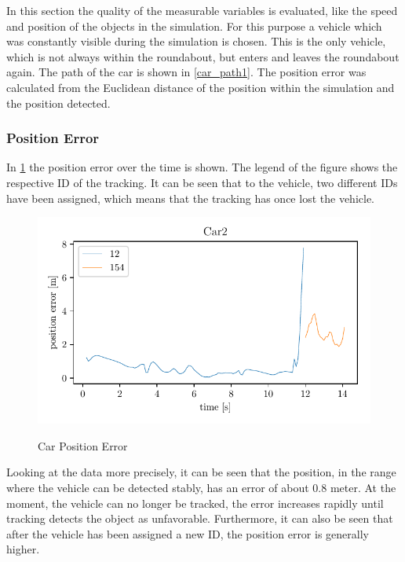 \documentclass[11pt,oneside,openright]{mpreport}
\begin{document}
In this section the quality of the measurable variables is evaluated, like the speed and position of the objects in the simulation.
For this purpose a vehicle which was constantly visible during the simulation is chosen.
This is the only vehicle, which is not always within the roundabout, but enters and leaves the roundabout again. 
The path of the car is shown in \cref{car_path1}. The position error was calculated from the Euclidean distance of the position within the simulation and the position detected.

\subsubsection{Position Error}


In \cref{car_pos_err} the position error over the time is shown. The legend of the figure shows the respective ID of the tracking. 
It can be seen that to the vehicle, two different IDs have been assigned, which means that the tracking has once lost the vehicle.

\begin{figure}[!htb]
  \caption{Car Position Error} 
  \centering
  \includegraphics[width=\textwidth]{bilder/Car2_pos_err.pdf}
 \label{car_pos_err}
\end{figure}
Looking at the data more precisely, it can be seen that the position, in the range where the vehicle can be detected stably, has an error of about 0.8 meter.
At the moment, the vehicle can no longer be tracked, the error increases rapidly until tracking detects the object as unfavorable.
Furthermore, it can also be seen that after the vehicle has been assigned a new ID, the position error is generally higher.
\end{document}
